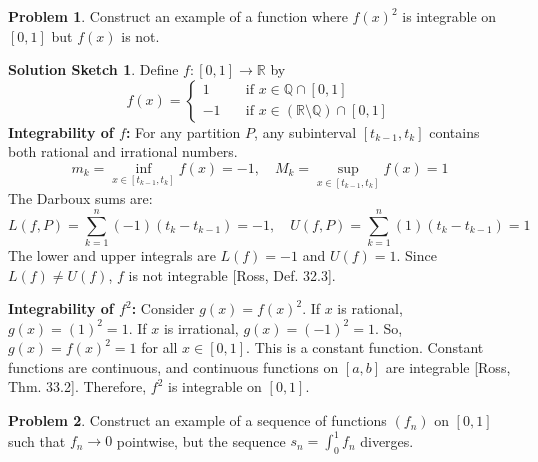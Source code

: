 \documentclass{article}
\theoremstyle{definition} %
\newtheorem{problem}{Problem}
\theoremstyle{definition} %
\newtheorem*{solution}{Solution Sketch}
\begin{document}
\begin{problem}
Construct an example of a function where $f(x)^2$ is integrable on $[0,1]$ but $f(x)$ is not.
\end{problem}

\begin{solution}
Define $f: [0,1] \to \mathbb{R}$ by
\[
f(x) = \begin{cases} 1 & \quad \text{if } x \in \mathbb{Q} \cap [0,1] \\ -1 & \quad \text{if } x \in (\mathbb{R} \setminus \mathbb{Q}) \cap [0,1] \end{cases}
\]
\textbf{Integrability of $f$:} For any partition $P$, any subinterval $[t_{k-1}, t_k]$ contains both rational and irrational numbers.
\[ m_k = \inf_{x \in [t_{k-1}, t_k]} f(x) = -1, \quad M_k = \sup_{x \in [t_{k-1}, t_k]} f(x) = 1 \]
The Darboux sums are:
\[ L(f,P) = \sum_{k=1}^n (-1)(t_k-t_{k-1}) = -1, \quad U(f,P) = \sum_{k=1}^n (1)(t_k-t_{k-1}) = 1 \]
The lower and upper integrals are $L(f) = -1$ and $U(f) = 1$. Since $L(f) \neq U(f)$, $f$ is not integrable [Ross, Def. 32.3].

\textbf{Integrability of $f^2$:} Consider $g(x) = f(x)^2$.
If $x$ is rational, $g(x) = (1)^2 = 1$. If $x$ is irrational, $g(x) = (-1)^2 = 1$.
So, $g(x) = f(x)^2 = 1$ for all $x \in [0,1]$. This is a constant function.
Constant functions are continuous, and continuous functions on $[a,b]$ are integrable [Ross, Thm. 33.2].
Therefore, $f^2$ is integrable on $[0,1]$.
\end{solution}

\begin{problem}
Construct an example of a sequence of functions $(f_n)$ on $[0,1]$ such that $f_n\to 0$ pointwise, but the sequence $s_n = \int_0^1 f_n$ diverges.
\end{problem}
\end{document}
